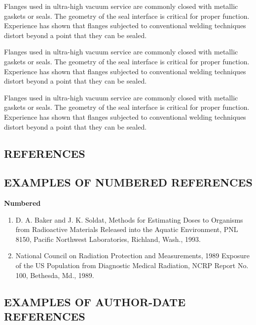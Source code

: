 \documentclass[11pt,letterpaper,twoside,english,final]{article}
\begin{document}
{Flanges used in ultra-high vacuum service are commonly closed with metallic gaskets or seals. The geometry of the seal interface is critical for proper function. Experience has shown that flanges subjected to conventional welding techniques distort beyond a point that they can be sealed.

Flanges used in ultra-high vacuum service are commonly closed with metallic gaskets or seals. The geometry of the seal interface is critical for proper function. Experience has shown that flanges subjected to conventional welding techniques distort beyond a point that they can be sealed.


Flanges used in ultra-high vacuum service are commonly closed with metallic gaskets or seals. The geometry of the seal interface is critical for proper function. Experience has shown that flanges subjected to conventional welding techniques distort beyond a point that they can be sealed.



\newpage
\clearemptydoublepage

\begin{center}
\section{REFERENCES}
\end{center}

\subsection*{EXAMPLES OF NUMBERED REFERENCES} 

{\bfseries Numbered}

\begin{enumerate}
\item D. A. Baker and J. K. Soldat, Methods for Estimating Doses to Organisms from Radioactive Materials Released into the Aquatic Environment, PNL 8150, Pacific Northwest Laboratories, Richland, Wash., 1993.\\

\item National Council on Radiation Protection and Measurements, 1989 Exposure of the US Population from Diagnostic Medical Radiation, NCRP Report No. 100, Bethesda, Md., 1989.\\
\end{enumerate}

\subsection*{EXAMPLES OF AUTHOR-DATE REFERENCES}

}
\end{document}
